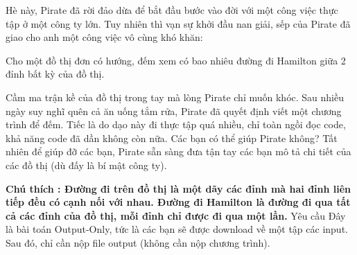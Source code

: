 Hè này, Pirate đã rời đảo dừa để bắt đầu bước vào đời với một công việc thực tập ở một công ty lớn. Tuy nhiên thì vạn sự khởi đầu nan giải, sếp của Pirate đã giao cho anh một công việc vô cùng khó khăn:

Cho một đồ thị đơn có hướng, đếm xem có bao nhiêu đường đi Hamilton giữa 2 đỉnh bất kỳ của đồ thị.

Cầm ma trận kề của đồ thị trong tay mà lòng Pirate chỉ muốn khóc. Sau nhiều ngày suy nghĩ quên cả ăn uống tắm rửa, Pirate đã quyết định viết một chương trình để đếm. Tiếc là do dạo này đi thực tập quá nhiều, chỉ toàn ngồi đọc code, khả năng code đã dần không còn nữa. Các bạn có thể giúp Pirate không? Tất nhiên để giúp đỡ các bạn, Pirate sẵn sàng đưa tận tay các bạn mô tả chi tiết của các đồ thị (dù đấy là bí mật công ty).

\textbf{Chú thích : Đường đi trên đồ thị là một dãy các đỉnh mà hai đỉnh liên tiếp đều có cạnh nối với nhau. Đường đi Hamilton là đường đi qua tất cả các đỉnh của đồ thị, mỗi đỉnh chỉ được đi qua một lần. }
Yêu cầu
Đây là bài toán Output-Only, tức là các bạn sẽ được download về một tập các input. Sau đó, chỉ cần nộp file output (không cần nộp chương trình).